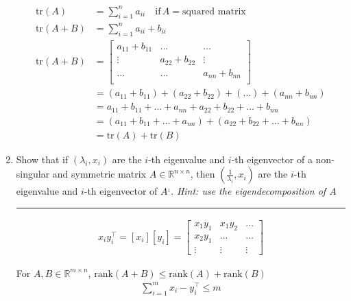 \documentclass[12pt]{article}
\begin{document}
\begin{enumerate}
    \begin{align*}
        \textrm{tr}(A) &= \sum_{i=1}^{n} a_{ii} \quad \textrm{if} \, A = \textrm{squared matrix} \\
        \textrm{tr}(A + B) &= \sum_{i=1}^{n} a_{ii} + b_{ii}\\
        \textrm{tr}(A + B) &= 
        \begin{bmatrix}
            a_{11} + b_{11}  &   \dots            &   \dots            \\
            \vdots           &   a_{22} + b_{22}  &   \vdots           \\  
            \dots            &   \dots            &   a_{nn} + b_{nn}  \\
        \end{bmatrix} \\
         &= ( a_{11} + b_{11}  ) + ( a_{22} + b_{22} ) + ( \dots ) + ( a_{nn} + b_{nn}  ) \\
         &= a_{11} + b_{11} + \dots +  a_{nn}  +  a_{22} + b_{22}  +  \dots   + b_{nn}   \\
         &= ( a_{11} + b_{11} + \dots +  a_{nn} ) + ( a_{22} + b_{22}  +  \dots   + b_{nn} )   \\
         &= \textrm{tr}(A) + \textrm{tr}(B)
    \end{align*}   

    \item Show that if $(\lambda_i, x_i)$ are the $i$-th eigenvalue and $i$-th eigenvector of a non-singular and symmetric matrix 
          $A \in \mathbb{R}^{n \times n}$, then $( \frac{1}{\lambda_i}, x_i)$ are the $i$-th eigenvalue and $i$-th eigenvector of $A^{_1}$.
          \textit{Hint: use the eigendecomposition of $A$}
    
    \noindent\rule{\linewidth}{1pt}

    \begin{align*}
        x_i y_i^\intercal = [x_i][y_i] = 
        \begin{bmatrix}
            x_1 y_1          &   x_1 y_2          &   \dots            \\
            x_2 y_1          &   \dots            &   \dots            \\
            \vdots           &   \vdots           &   \vdots            
        \end{bmatrix}
    \end{align*}
    
    For $A,B \in \mathbb{R}^{m \times n}$, $\textrm{rank}(A+B) \leq \textrm{rank}(A) + \textrm{rank}(B)$
    \begin{align*}
        \sum_{i=1}^m x_i - y_i^\intercal \leq m 
    \end{align*}   


\end{enumerate}
\end{document}

